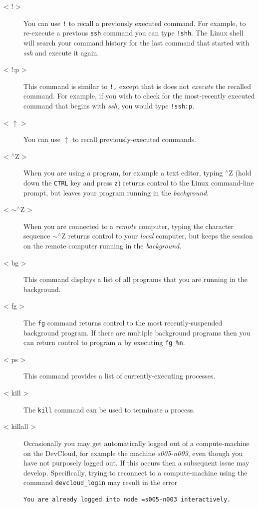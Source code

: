 \documentclass[11pt, twoside, pdftex]{article}
\begin{document}
\begin{description}
\item [< ! >] You can use \texttt{!} to recall a previously executed command. 
For example, to
re-execute a previous \texttt{ssh} command you can type \texttt{!shh}. The Linux shell will 
search your command history for the last command that started with {\it ssh} and execute it again.
\item [< !:p >] This command is similar to \texttt{!,} except that is does not 
{\it execute} the
recalled command. For example, if you wish to check for the most-recently executed command
that begins with {\it ssh}, you would type \texttt{!ssh:p}.
\item [< $\uparrow$ >] You can use $\uparrow$ to recall previously-executed commands.
\item [< $^\wedge$Z >] When you are using a program, for example a text editor, typing 
$^\wedge$Z (hold down the \texttt{CTRL} key and press \texttt{z})
returns control to the Linux command-line prompt, but leaves your program
running in the {\it background}.
\item [< $\sim^\wedge$Z >] When you are connected to a {\it remote} computer, typing the
character sequence $\sim^\wedge$Z returns control to your {\it local} computer, but keeps the
session on the remote computer running in the {\it background}.
\item [< bg >] This command displays a list of all programs that you are running in 
the background.
\item [< fg >] The \texttt{fg} command returns control to the most recently-suspended 
background program. If there are multiple background programs then you can return control to 
program $n$ by executing \texttt{fg \%n}.
\item [< ps >] This command provides a list of currently-executing processes.
\item [< kill >] The \texttt{kill} command can be used to terminate a process.
\item [< killall >] Occasionally you may get automatically logged out of a compute-machine
on the DevCloud, for example the machine {\it s005-n003}, even though you have not purposely 
logged out. If this occurs then a subsequent issue may develop. Specifically, trying to reconnect
to a compute-machine using the command \texttt{devcloud\_login} may result in the error
\begin{lstlisting}
You are already logged into node =s005-n003 interactively.
\end{lstlisting}


\end{description}
\end{document}
